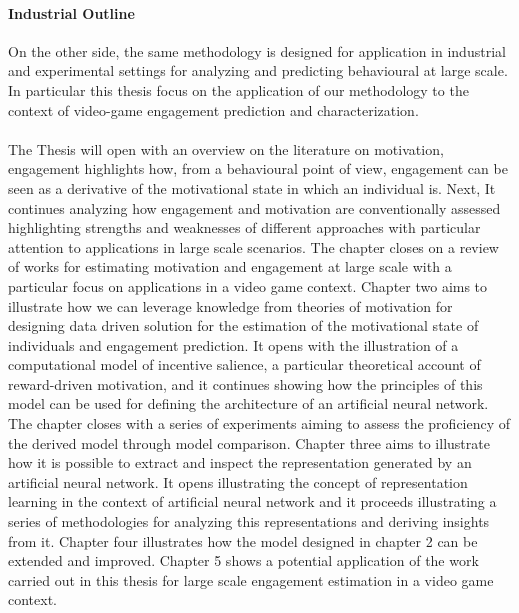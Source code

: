 \paragraph*{Industrial Outline}
On the other side, the same methodology is designed for application in industrial and experimental settings for analyzing and predicting behavioural at large scale. In particular this thesis focus on the application of our methodology to the context of video-game engagement prediction and characterization.
\\
\\
The Thesis will open with an overview on the literature on motivation, engagement highlights how, from a behavioural point of view, engagement can be seen as a derivative of the motivational state in which an individual is. Next, It continues analyzing how engagement and motivation are conventionally assessed highlighting strengths and weaknesses of different approaches with particular attention to applications in large scale scenarios. The chapter closes on a review of works for estimating motivation and engagement at large scale with a particular focus on applications in a video game context. Chapter two aims to illustrate how we can leverage knowledge from theories of motivation for designing data driven solution for the estimation of the motivational state of individuals and engagement prediction. It opens with the illustration of a computational model of incentive salience, a particular theoretical account of reward-driven motivation, and it continues showing how the principles of this model can be used for defining the architecture of an artificial neural network. The chapter closes with a series of experiments aiming to assess the proficiency of the derived model through model comparison. Chapter three aims to illustrate how it is possible to extract and inspect the representation generated by an artificial neural network. It opens illustrating the concept of representation learning in the context of artificial neural network and it proceeds illustrating a series of methodologies for analyzing this representations and deriving insights from it. Chapter four illustrates how the model designed in chapter 2 can be extended and improved. Chapter 5 shows a potential application of the work carried out in this thesis for large scale engagement estimation in a video game context.


